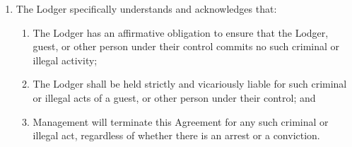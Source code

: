 \documentclass[12pt,letterpaper]{article}
\newcommand{\lodger}{Lodger}
\newcommand{\management}{Management}
\begin{document}
\begin{enumerate}
\begin{enumerate}
\begin{enumerate}
\begin{enumerate}
						\end{enumerate} 
					\item The \lodger{} specifically understands and acknowledges that: 
						\begin{enumerate} 
							\item	The \lodger{} has an affirmative obligation to ensure that the \lodger{}, guest, or other person under their control commits no such criminal or illegal activity; 
							\item The \lodger{} shall be held strictly and vicariously liable for such criminal or illegal acts of a guest, or other person under their control; and 
							\item \management{} will terminate this Agreement for any such criminal or illegal act, regardless of whether there is an arrest or a conviction. 
						\end{enumerate}
						

\end{enumerate}
\end{enumerate}
\end{enumerate}
\end{document}
